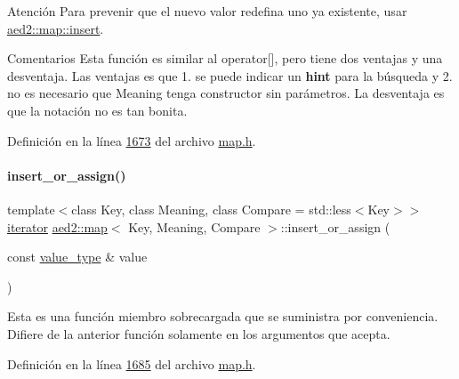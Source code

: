 \begin{DoxyAttention}{Atención}
Para prevenir que el nuevo valor redefina uno ya existente, usar \hyperlink{classaed2_1_1map_a6941cde9a79c27f054b5c97a587a1854_a6941cde9a79c27f054b5c97a587a1854}{aed2\+::map\+::insert}. 
\end{DoxyAttention}
\begin{DoxyRemark}{Comentarios}
Esta función es similar al operator\mbox{[}\mbox{]}, pero tiene dos ventajas y una desventaja. Las ventajas es que 1. se puede indicar un {\bfseries hint} para la búsqueda y 2. no es necesario que Meaning tenga constructor sin parámetros. La desventaja es que la notación no es tan bonita. 
\end{DoxyRemark}


Definición en la línea \hyperlink{map_8h_source_l01673}{1673} del archivo \hyperlink{map_8h_source}{map.\+h}.

\mbox{\label{classaed2_1_1map_a9128a806713bcc999ebd8a97ab77e765_a9128a806713bcc999ebd8a97ab77e765}} 
\paragraph{\texorpdfstring{insert\+\_\+or\+\_\+assign()}{insert\_or\_assign()}\hspace{0.1cm}{\footnotesize\ttfamily [2/2]}}
{\footnotesize\ttfamily template$<$class Key, class Meaning, class Compare = std\+::less$<$\+Key$>$$>$ \\
\hyperlink{classaed2_1_1map_1_1iterator}{iterator} \hyperlink{classaed2_1_1map}{aed2\+::map}$<$ Key, Meaning, Compare $>$\+::insert\+\_\+or\+\_\+assign (\begin{DoxyParamCaption}\item[{const \hyperlink{classaed2_1_1map_a719db98e0ff9a837610f76be33264680_a719db98e0ff9a837610f76be33264680}{value\+\_\+type} \&}]{value }\end{DoxyParamCaption})\hspace{0.3cm}{\ttfamily [inline]}}

Esta es una función miembro sobrecargada que se suministra por conveniencia. Difiere de la anterior función solamente en los argumentos que acepta. 

Definición en la línea \hyperlink{map_8h_source_l01685}{1685} del archivo \hyperlink{map_8h_source}{map.\+h}.

